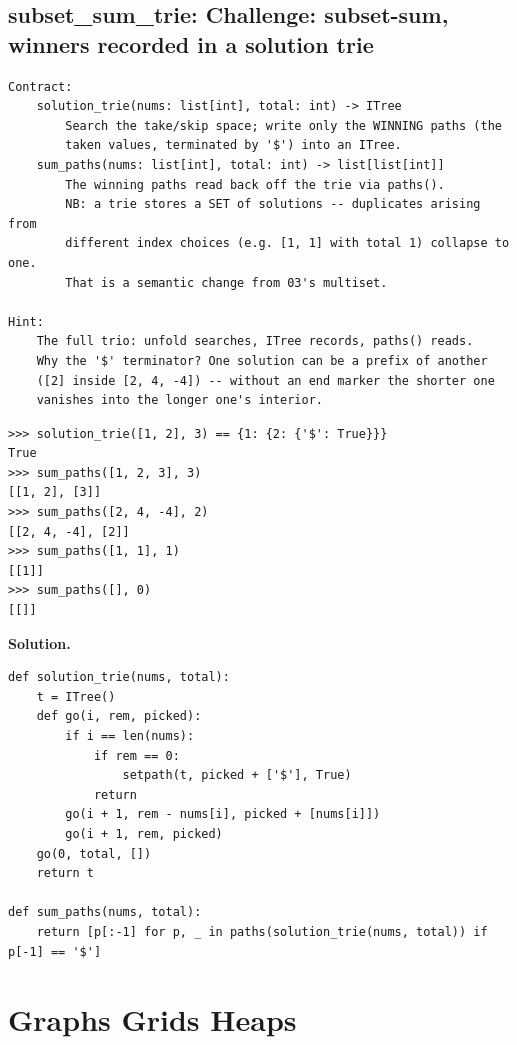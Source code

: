 \documentclass[10pt,letterpaper]{book}
\begin{document}
\section{subset\_sum\_trie: Challenge: subset-sum, winners recorded in a solution trie}
\begin{lstlisting}[style=ex]
Contract:
    solution_trie(nums: list[int], total: int) -> ITree
        Search the take/skip space; write only the WINNING paths (the
        taken values, terminated by '$') into an ITree.
    sum_paths(nums: list[int], total: int) -> list[list[int]]
        The winning paths read back off the trie via paths().
        NB: a trie stores a SET of solutions -- duplicates arising from
        different index choices (e.g. [1, 1] with total 1) collapse to one.
        That is a semantic change from 03's multiset.

Hint:
    The full trio: unfold searches, ITree records, paths() reads.
    Why the '$' terminator? One solution can be a prefix of another
    ([2] inside [2, 4, -4]) -- without an end marker the shorter one
    vanishes into the longer one's interior.
\end{lstlisting}
\begin{lstlisting}[style=ex]
>>> solution_trie([1, 2], 3) == {1: {2: {'$': True}}}
True
>>> sum_paths([1, 2, 3], 3)
[[1, 2], [3]]
>>> sum_paths([2, 4, -4], 2)
[[2, 4, -4], [2]]
>>> sum_paths([1, 1], 1)
[[1]]
>>> sum_paths([], 0)
[[]]
\end{lstlisting}
\noindent\textbf{Solution.}
\begin{lstlisting}[style=code]
def solution_trie(nums, total):
    t = ITree()
    def go(i, rem, picked):
        if i == len(nums):
            if rem == 0:
                setpath(t, picked + ['$'], True)
            return
        go(i + 1, rem - nums[i], picked + [nums[i]])
        go(i + 1, rem, picked)
    go(0, total, [])
    return t

def sum_paths(nums, total):
    return [p[:-1] for p, _ in paths(solution_trie(nums, total)) if p[-1] == '$']
\end{lstlisting}
\chapter{Graphs Grids Heaps}
\end{document}
